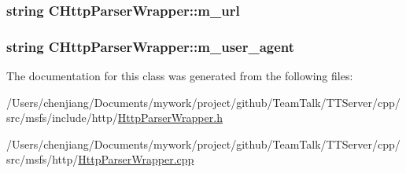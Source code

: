 \subsubsection[{m\+\_\+url}]{\setlength{\rightskip}{0pt plus 5cm}string C\+Http\+Parser\+Wrapper\+::m\+\_\+url\hspace{0.3cm}{\ttfamily [private]}}\label{class_c_http_parser_wrapper_a9f5239015aea78ed1d87d3f06d607f7a}
\hypertarget{class_c_http_parser_wrapper_ab403f435670bec6cb88e8023c433d382}{}
\subsubsection[{m\+\_\+user\+\_\+agent}]{\setlength{\rightskip}{0pt plus 5cm}string C\+Http\+Parser\+Wrapper\+::m\+\_\+user\+\_\+agent\hspace{0.3cm}{\ttfamily [private]}}\label{class_c_http_parser_wrapper_ab403f435670bec6cb88e8023c433d382}


The documentation for this class was generated from the following files\+:\begin{DoxyCompactItemize}
\item 
/\+Users/chenjiang/\+Documents/mywork/project/github/\+Team\+Talk/\+T\+T\+Server/cpp/src/msfs/include/http/\hyperlink{msfs_2include_2http_2_http_parser_wrapper_8h}{Http\+Parser\+Wrapper.\+h}\item 
/\+Users/chenjiang/\+Documents/mywork/project/github/\+Team\+Talk/\+T\+T\+Server/cpp/src/msfs/http/\hyperlink{msfs_2http_2_http_parser_wrapper_8cpp}{Http\+Parser\+Wrapper.\+cpp}\end{DoxyCompactItemize}
